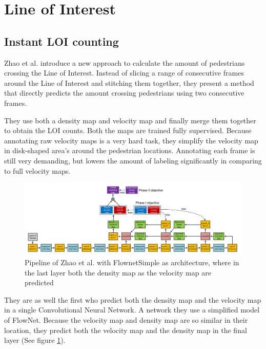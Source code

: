 \section{Line of Interest}

\subsection{Instant LOI counting}
Zhao et al. \cite{leibe_crossing-line_2016} introduce a new approach to calculate the amount of pedestrians crossing the Line of Interest. Instead of slicing a range of consecutive frames around the Line of Interest and stitching them together, they present a method that directly predicts the amount crossing pedestrians using two consecutive frames.

They use both a density map and velocity map and finally merge them together to obtain the LOI counts. Both the maps are trained fully supervised. Because annotating raw velocity maps is a very hard task, they simplify the velocity map in disk-shaped area's around the pedestrian locations. Annotating each frame is still very demanding, but lowers the amount of labeling significantly in comparing to full velocity maps.

\begin{figure}[h]
\centering
\includegraphics[width=1.0\textwidth]{images/zhao16_model}
\caption{Pipeline of Zhao et al. with FlownetSimple as architecture, where in the last layer both the density map as the velocity map are predicted}
\label{fig:zhao_model}
\end{figure}


They are as well the first who predict both the density map and the velocity map in a single Convolutional Neural Network. A network they use a  simplified model of FlowNet. Because the velocity map and density map are so similar in their location, they predict both the velocity map and the density map in the final layer (See figure \ref{fig:zhao_model}).

